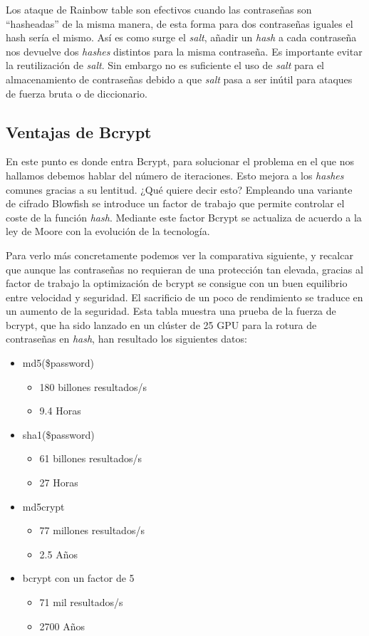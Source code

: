 Los ataque de Rainbow table son efectivos cuando las contraseñas son ``hasheadas'' de la misma manera, de esta forma para dos contraseñas iguales el hash sería el mismo. Así es como surge el \textit{salt}, añadir un \textit{hash} a cada contraseña nos devuelve dos \textit{hashes} distintos para la misma contraseña. Es importante evitar la reutilización de \textit{salt}. Sin embargo no es suficiente el uso de \textit{salt} para el almacenamiento de contraseñas debido a que \textit{salt} pasa a ser inútil para ataques de fuerza bruta o de diccionario.


\subsection{Ventajas de Bcrypt}
En este punto es donde entra Bcrypt, para solucionar el problema en el que nos hallamos debemos hablar del número de iteraciones. Esto mejora a los \textit{hashes} comunes gracias a su lentitud. ¿Qué quiere decir esto? Empleando una variante de cifrado Blowfish se introduce un factor de trabajo que permite controlar el coste de la función \textit{hash}. Mediante este factor Bcrypt se actualiza de acuerdo a la ley de Moore con la evolución de la tecnología.


Para verlo más concretamente podemos ver la comparativa siguiente, y recalcar que aunque las contraseñas no requieran de una protección tan elevada, gracias al factor de trabajo la optimización de bcrypt se consigue con un buen equilibrio entre velocidad y seguridad. El sacrificio de un poco de rendimiento se traduce en un aumento de la seguridad. 
Esta tabla muestra una prueba de la fuerza de bcrypt, que ha sido lanzado en un clúster de 25 GPU para la rotura de contraseñas en \textit{hash}, han resultado los siguientes datos:


\begin{itemize}
\item md5(\$password) 
\begin{itemize}
\item 180 billones resultados/s
\item 9.4 Horas
\end{itemize}
\item sha1(\$password)
\begin{itemize}
\item 61 billones resultados/s
\item 27 Horas
\end{itemize}
\item md5crypt
\begin{itemize}
\item 77 millones resultados/s
\item 2.5 Años
\end{itemize}
\item bcrypt con un factor de 5 
\begin{itemize}
\item 71 mil resultados/s
\item 2700 Años
\end{itemize}
\end{itemize}


